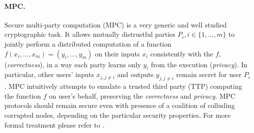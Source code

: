\documentclass[
  digital, %
  twoside, %
  table,   %
  lof,     %
  lot,     %
]{fithesis3}
\newcounter{ph4_show_guides}
\theoremstyle{definition}
\theoremstyle{remark}
\begin{document}
\paragraph{MPC.}%
Secure multi-party computation (MPC) is a very generic and well studied cryptographic task.
It allows mutually distrustful parties $P_i, i \in \{1,\dots,m\}$ to jointly perform a distributed computation of a function $f(x_i,\dots,x_m) = (y_i,\dots,y_m)$ on their inputs $x_i$ consistently with the $f$, (\emph{correctness}), in a way each party learns only $y_i$ from the execution (\emph{privacy}). In particular, other users' inputs $x_{j, j \neq i}$ and outputs $y_{j, j \neq i}$ remain secret for user $P_i$.
MPC intuitively attempts to emulate a trusted third party (TTP) computing the function $f$ on user's behalf, preserving the \emph{correctness} and \emph{privacy}.
MPC protocols should remain secure even with presence of a coalition of colluding corrupted nodes, depending on the particular security properties.
For more formal treatment please refer to \cite{G09}.
\end{document}
